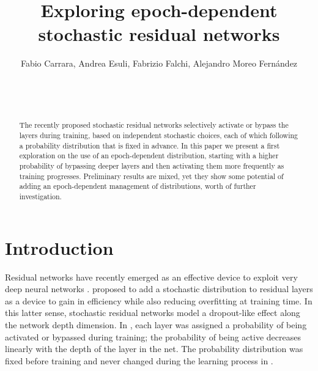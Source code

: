 \documentclass{sig-alternate}
\begin{document}


\doi{}

\isbn{}


\title{Exploring epoch-dependent stochastic residual networks}

%
\author{
%
%
\alignauthor
Fabio Carrara, Andrea Esuli, Fabrizio Falchi, Alejandro Moreo Fern\'andez\\
       \\
       \\
       \\
}


\maketitle
\begin{abstract}
The recently proposed stochastic residual networks selectively activate or bypass the layers during training, based on independent stochastic choices, each of which following a probability distribution that is fixed in advance.
In this paper we present a first exploration on the use of an epoch-dependent distribution, starting with a higher probability of bypassing deeper layers and then activating them more frequently as training progresses.
Preliminary results are mixed, yet they show some potential of adding an epoch-dependent management of distributions, worth of further investigation.
\end{abstract}



\printccsdesc



\section{Introduction}
Residual networks have recently emerged as an effective device to exploit very deep neural networks \cite{he2015deep}.
\cite{huang2016deep} proposed to add a stochastic distribution to residual layers as a device to gain in efficiency while also reducing overfitting at training time.
In this latter sense, stochastic residual networks model a dropout-like effect along the network depth dimension.
In \cite{huang2016deep}, each layer was assigned a probability of being activated or bypassed during training; the probability of being active decreases linearly with the depth of the layer in the net.
The probability distribution was fixed before training and never changed during the learning process in \cite{huang2016deep}.
\end{document}
